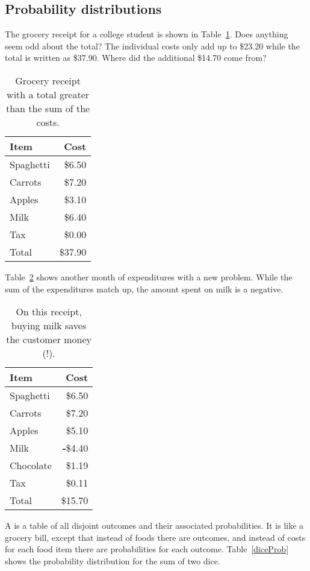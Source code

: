 \subsection{Probability distributions}

The grocery receipt for a college student is shown in Table~\ref{expendituresCollegeStudent1}. Does anything seem odd about the total? The individual costs only add up to \$23.20 while the total is written as \$37.90. Where did the additional \$14.70 come from?
\begin{table}[ht]
\centering
\begin{tabular}{l r}
  \hline
  Item & Cost \\
  \hline
  Spaghetti & \$6.50 \\
  Carrots & \$7.20 \\
  Apples & \$3.10 \\
  Milk & \$6.40 \\
  Tax & \$0.00 \\
  \hline
  Total & \$37.90 \\
  \hline
\end{tabular}
\caption{Grocery receipt with a total greater than the sum of the costs.}
\label{expendituresCollegeStudent1}
\end{table}

Table~\ref{expendituresCollegeStudent2} shows another month of expenditures with a new problem. While the sum of the expenditures match up, the amount spent on milk is a negative.
\begin{table}[ht]
\centering
\begin{tabular}{l r}
  \hline
  Item & Cost \\
  \hline
  Spaghetti & \$6.50 \\
  Carrots & \$7.20 \\
  Apples & \$5.10 \\
  Milk & \textbf{-}\$4.40 \\
  Chocolate & \$1.19 \\
  Tax & \$0.11 \\
  \hline
  Total & \$15.70 \\
  \hline
\end{tabular}
\caption{On this receipt, buying milk saves the customer money (!).}
\label{expendituresCollegeStudent2}
\end{table}


A  is a table of all disjoint outcomes and their associated probabilities. It is like a grocery bill, except that instead of foods there are outcomes, and instead of costs for each food item there are probabilities for each outcome. Table~\ref{diceProb} shows the probability distribution for the sum of two dice. 

